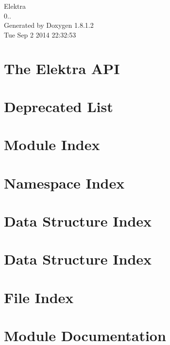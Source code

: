 \documentclass{book}
\begin{document}
\hypersetup{pageanchor=false,citecolor=blue}
\begin{titlepage}
\vspace*{7cm}
\begin{center}
{\Large Elektra \\[1ex]\large 0.. }\\
\vspace*{1cm}
{\large Generated by Doxygen 1.8.1.2}\\
\vspace*{0.5cm}
{\small Tue Sep 2 2014 22:32:53}\\
\end{center}
\end{titlepage}
\clearemptydoublepage
{}
\tableofcontents
\clearemptydoublepage
{}
\hypersetup{pageanchor=true,citecolor=blue}
\chapter{The Elektra A\-P\-I}
\label{index}\hypertarget{index}{}
\chapter{Deprecated List}
\label{deprecated}
\hypertarget{deprecated}{}

\chapter{Module Index}

\chapter{Namespace Index}

\chapter{Data Structure Index}

\chapter{Data Structure Index}

\chapter{File Index}

\chapter{Module Documentation}









\end{document}
